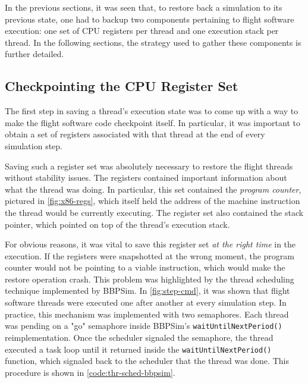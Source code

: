 In the previous sections, it was seen that, to restore back a simulation to its previous state, one had to backup two components pertaining to flight software execution: one set of CPU registers per thread and one execution stack per thread. In the following sections, the strategy used to gather these components is further detailed.

\subsection*{Checkpointing the CPU Register Set}
The first step in saving a thread's execution state was to come up with a way to make the flight software code checkpoint itself. In particular, it was important to obtain a set of registers associated with that thread at the end of every simulation step.

Saving such a register set was absolutely necessary to restore the flight threads without stability issues. The registers contained important information about what the thread was doing. In particular, this set contained the \textit{program counter}, pictured in \autoref{fig:x86-regs}, which itself held the address of the machine instruction the thread would be currently executing. The register set also contained the stack pointer, which pointed on top of the thread's execution stack.

For obvious reasons, it was vital to save this register set \textit{at the right time} in the execution. If the registers were snapshotted at the wrong moment, the program counter would not be pointing to a viable instruction, which would make the restore operation crash. This problem was highlighted by the thread scheduling technique implemented by BBPSim. In \autoref{fig:step-cmd}, it was shown that flight software threads were executed one after another at every simulation step. In practice, this mechanism was implemented with two semaphores. Each thread was pending on a "go" semaphore inside BBPSim's \texttt{waitUntilNextPeriod()} reimplementation. Once the scheduler signaled the semaphore, the thread executed a task loop until it returned inside the \texttt{waitUntilNextPeriod()} function, which signaled back to the scheduler that the thread was done. This procedure is shown in \autoref{code:thr-sched-bbpsim}.

